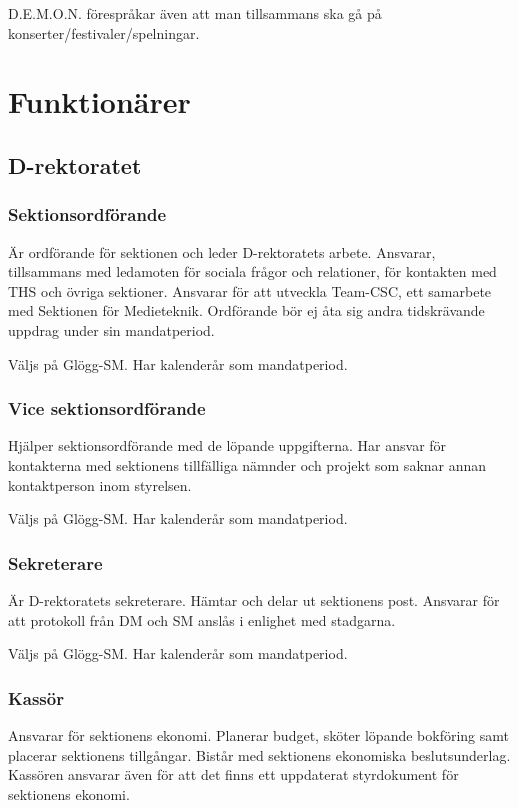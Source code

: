 \documentclass{dgovdoc}
\begin{document}
D.E.M.O.N. förespråkar även att man tillsammans ska gå på
konserter/festivaler/spelningar.

\section{Funktionärer}

\subsection{D-rektoratet}

\subsubsection{Sektionsordförande}

Är ordförande för sektionen och leder D-rektoratets arbete. Ansvarar,
tillsammans med ledamoten för sociala frågor och relationer, för kontakten med
THS och övriga sektioner. Ansvarar för att utveckla Team-CSC, ett samarbete med
Sektionen för Medieteknik. Ordförande bör ej åta sig andra tidskrävande uppdrag
under sin mandatperiod.

Väljs på Glögg-SM. Har kalenderår som mandatperiod.

\subsubsection{Vice sektionsordförande}

Hjälper sektionsordförande med de löpande uppgifterna. Har ansvar för
kontakterna med sektionens tillfälliga nämnder och projekt som saknar annan
kontaktperson inom styrelsen.

Väljs på Glögg-SM. Har kalenderår som mandatperiod.

\subsubsection{Sekreterare}

Är D-rektoratets sekreterare. Hämtar och delar ut sektionens post. Ansvarar
för att protokoll från DM och SM anslås i enlighet med stadgarna.

Väljs på Glögg-SM. Har kalenderår som mandatperiod.

\subsubsection{Kassör}

Ansvarar för sektionens ekonomi. Planerar budget, sköter löpande bokföring
samt placerar sektionens tillgångar. Bistår med sektionens ekonomiska
beslutsunderlag. Kassören ansvarar även för att det finns ett uppdaterat
styrdokument för sektionens ekonomi.
\end{document}
